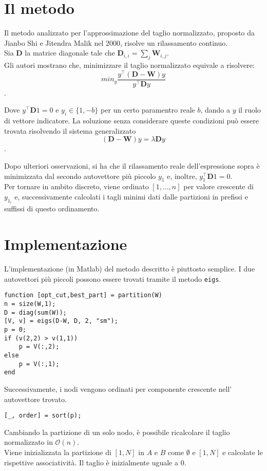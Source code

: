 \documentclass{article}
\newcommand{\W}{\mathbf{W}}
\newcommand{\D}{\mathbf{D}}
\begin{document}
\begin{multicols}{2}
\section{Il metodo}
Il metodo analizzato per l'approssimazione del taglio normalizzato, proposto da Jianbo Shi e Jitendra Malik nel 2000, risolve un rilassamento continuo.\\
Sia $\D$ la matrice diagonale tale che $\D_{i,i} = \sum_j \W_{i,j}$.\\
Gli autori mostrano che, minimizzare il taglio normalizzato equivale a risolvere:
$$ min_y\frac{y^\top (\D-\W)y}{y ^\top \D y}$$.

Dove $y^\top \D 1 = 0$ e $y_i\in\{1, -b\}$ per un certo paramentro reale $b$, dando a $y$ il ruolo di vettore indicatore.
La soluzione senza considerare queste condizioni pu\`o essere trovata risolvendo il sistema generalizzato
$$ (\D - \W)y = \lambda \D y $$.

Dopo ulteriori osservazioni, si ha che il rilassamento reale dell'espressione sopra \`e minimizzata dal secondo autovettore pi\`u piccolo $y_1$ e, inoltre, $y_1^\top \D 1 = 0$. \\
Per tornare in ambito discreto, viene ordinato $[1, \ldots, n]$ per valore crescente di $y_{1_i}$ e, successivamente calcolati i tagli minimi dati dalle partizioni in prefissi e suffissi di questo ordinamento.

\section{Implementazione}

L'implementazione (in Matlab) del metodo descritto \`e piuttosto semplice.
I due autovettori pi\`u piccoli possono essere trovati tramite il metodo
\texttt{eigs}.

\begin{lstlisting}[style=Matlab-editor]
function [opt_cut,best_part] = partition(W)
n = size(W,1);
D = diag(sum(W));
[V, v] = eigs(D-W, D, 2, "sm");
p = 0;
if (v(2,2) > v(1,1))
    p = V(:,2);
else
    p = V(:,1);
end
\end{lstlisting}

Successivamente, i nodi vengono ordinati per componente crescente nell'
autovettore trovato.

\begin{lstlisting}[style=Matlab-editor]
[_, order] = sort(p);
\end{lstlisting}

Cambiando la partizione di un solo nodo, \`e possibile ricalcolare il taglio normalizzato
in $\mathcal{O}(n)$.\\ Viene inizializzata la partizione di $[1, N]$ in $A$ e $B$ come
$\emptyset$ e $[1, N]$ e calcolate le rispettive associativit\`a. Il taglio \`e inizialmente uguale a $0$.


\end{multicols}
\end{document}
